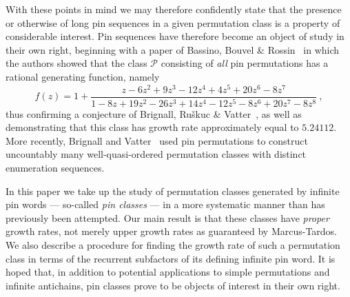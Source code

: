 \documentclass[11pt,a4paper]{article}
\theoremstyle{definition}
\begin{document}
With these points in mind we may therefore confidently state that the presence or otherwise of long pin sequences in a given permutation class is a property of considerable interest. Pin sequences have therefore become an object of study in their own right, beginning with a paper of Bassino, Bouvel \& Rossin~\cite{bassino:enumeration-of-:} in which the authors showed that the class $\mathcal{P}$ consisting of \emph{all} pin permutations has a rational generating function, namely
\begin{equation} \label{eq:completepinclass}
f(z) = 1 + \frac{z - 6z^2 + 9z^3 - 12z^4 + 4z^5 + 20z^6 - 8z^7}{1 - 8z + 19z^2 - 26z^3 + 14z^4 - 12z^5 - 8z^6 + 20z^7 - 8z^8} \ ,
\end{equation}
thus confirming a conjecture of Brignall, Ru\v{s}kuc \& Vatter~\cite{brignall:simple-permutat:b}, as well as demonstrating that this class has growth rate approximately equal to $5.24112$. More recently, Brignall and Vatter~\cite{bv:wqo-uncountable:} used pin permutations to construct uncountably many well-quasi-ordered permutation classes with distinct enumeration sequences.

In this paper we take up the study of permutation classes generated by infinite pin words --- so-called \emph{pin classes} --- in a more systematic manner than has previously been attempted. Our main result is that these classes have \emph{proper} growth rates, not merely upper growth rates as guaranteed by Marcus-Tardos. We also describe a procedure for finding the growth rate of such a permutation class in terms of the recurrent subfactors of its defining infinite pin word. It is hoped that, in addition to potential applications to simple permutations and infinite antichains, pin classes prove to be objects of interest in their own right.
\end{document}
